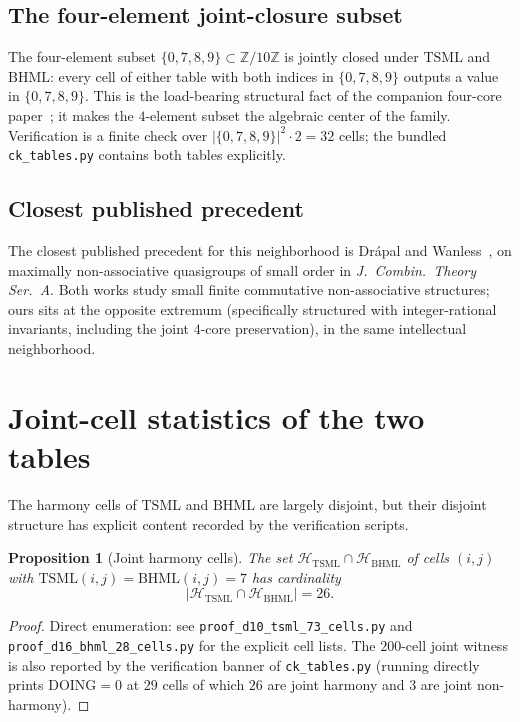 \documentclass[11pt,reqno]{amsart}
\theoremstyle{plain}
\newtheorem{proposition}[theorem]{Proposition}
\theoremstyle{definition}
\theoremstyle{remark}
\newcommand{\Z}{\mathbb{Z}}
\newcommand{\Zten}{\Z/10\Z}
\newcommand{\TSML}{\mathrm{TSML}}
\newcommand{\BHML}{\mathrm{BHML}}
\begin{document}
\subsection{The four-element joint-closure subset}

The four-element subset $\{0, 7, 8, 9\} \subset \Zten$ is jointly
closed under $\TSML$ and $\BHML$: every cell of either table with
both indices in $\{0, 7, 8, 9\}$ outputs a value in
$\{0, 7, 8, 9\}$. This is the load-bearing structural fact of the
companion four-core paper~\cite{FourCore}; it makes the $4$-element
subset the algebraic center of the family. Verification is a
finite check over $|\{0,7,8,9\}|^2 \cdot 2 = 32$ cells; the
bundled \texttt{ck\_tables.py} contains both tables explicitly.

\subsection{Closest published precedent}

The closest published precedent for this neighborhood is
Dr\'apal and Wanless~\cite{DrapalWanless2021}, on maximally
non-associative quasigroups of small order in
\emph{J.\ Combin.\ Theory Ser.\ A}. Both works study small
finite commutative non-associative structures; ours sits at the
opposite extremum (specifically structured with integer-rational
invariants, including the joint $4$-core preservation), in the
same intellectual neighborhood.

\section{Joint-cell statistics of the two tables}
\label{sec:joint}

The harmony cells of $\TSML$ and $\BHML$ are largely disjoint, but
their disjoint structure has explicit content recorded by the
verification scripts.

\begin{proposition}[Joint harmony cells]\label{prop:joint}
The set $\mathcal{H}_{\TSML} \cap \mathcal{H}_{\BHML}$ of cells
$(i, j)$ with $\TSML(i, j) = \BHML(i, j) = 7$ has cardinality
\[
  \bigl|\mathcal{H}_{\TSML} \cap \mathcal{H}_{\BHML}\bigr| = 26.
\]
\end{proposition}

\begin{proof}
Direct enumeration: see
\texttt{proof\_d10\_tsml\_73\_cells.py} and
\texttt{proof\_d16\_bhml\_28\_cells.py} for the explicit cell
lists. The $200$-cell joint witness is also reported by the
verification banner of \texttt{ck\_tables.py} (running directly
prints $\mathrm{DOING} = 0$ at $29$ cells of which $26$ are joint
harmony and $3$ are joint non-harmony).
\end{proof}
\end{document}
